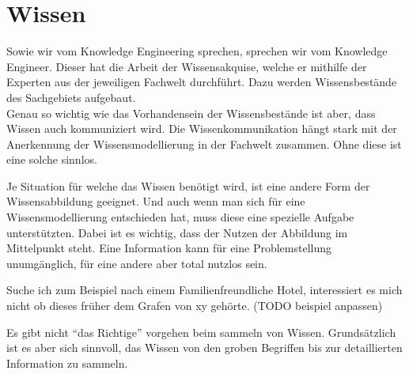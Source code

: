 \section{Wissen}
\label{chap:einleitung_wissen}


Sowie wir vom Knowledge Engineering sprechen, sprechen wir vom Knowledge Engineer. Dieser hat die Arbeit der Wissensakquise, welche er mithilfe der Experten aus der jeweiligen Fachwelt durchführt. Dazu werden Wissensbestände des Sachgebiets aufgebaut. \\
Genau so wichtig wie das Vorhandensein der Wissensbestände ist aber, dass Wissen auch kommuniziert wird. Die Wissenkommunikation hängt stark mit der Anerkennung der Wissensmodellierung in der Fachwelt zusammen. Ohne diese ist eine solche sinnlos.
 
Je Situation für welche das Wissen benötigt wird, ist eine andere Form der Wissensabbildung geeignet. Und auch wenn man sich für eine Wissensmodellierung entschieden hat, muss diese eine spezielle Aufgabe unterstützten. Dabei ist es wichtig, dass der Nutzen der Abbildung im Mittelpunkt steht. Eine Information kann für eine Problemstellung unumgänglich, für eine andere aber total nutzlos sein.

\noindent\hspace*{15mm}Suche ich zum Beispiel nach einem Familienfreundliche Hotel, interessiert es mich nicht ob dieses früher dem Grafen von xy gehörte. (TODO beispiel anpassen)

Es gibt nicht "`das Richtige"' vorgehen beim sammeln von Wissen. Grundsätzlich ist es aber sich sinnvoll, das Wissen von den groben Begriffen bis zur detaillierten Information zu sammeln. 
